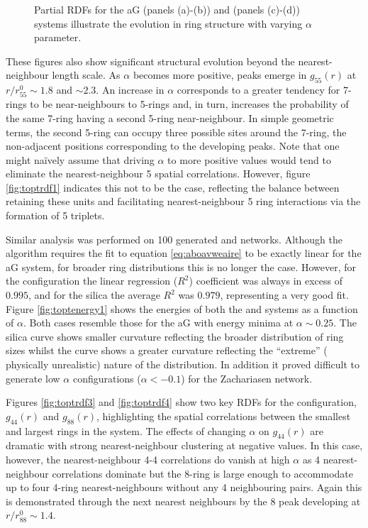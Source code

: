 \begin{figure}[bt]
     \caption{Partial RDFs for the aG (panels (a)\--(b)) and \zach{} (panels (c)\--(d)) systems illustrate the evolution in ring structure with varying $\alpha$ parameter.}
     \label{fig:toptrdf}
\end{figure}

These figures also show significant structural evolution beyond the nearest-neighbour length scale. 
As $\alpha$ becomes more positive, peaks emerge in $g_{55}\left(r\right)$ at $r/r_{55}^0\sim{1.8}$ and $\sim{2.3}$. 
An increase in $\alpha$ corresponds to a greater tendency for 7\--rings to
be near\--neighbours to 5\--rings and, in turn, increases the probability of the same 7\--ring having a second 5\--ring near\--neighbour. 
In simple geometric terms, the second 5\--ring can occupy three possible sites around the 7\--ring, the non\--adjacent positions corresponding to the developing peaks. 
Note that one might na\"ively assume that driving $\alpha$ to more positive values would tend to eliminate the nearest-neighbour 5 spatial correlations. However, figure \ref{fig:toptrdf1} indicates this not to be the case, reflecting the balance between retaining these units and facilitating nearest\--neighbour 5 ring interactions via the formation of 5 triplets.

Similar analysis was performed on 100 generated \zach{} and \sioii{} networks.
Although the algorithm requires the fit to equation \eqref{eq:aboavweaire} to be exactly linear for the aG system, for broader ring distributions this is no longer the case. 
However, for the \zach{} configuration the linear regression ($R^2$) coefficient was always in excess of $0.995$, and for the silica the average $R^{2}$ was $0.979$, representing a very good fit. 
Figure \ref{fig:toptenergy1} shows the energies of both the \zach{} and \sioii{} systems as a function of $\alpha$. 
Both cases resemble those for the aG with energy minima at $\alpha\sim{0.25}$. The silica curve shows smaller curvature reflecting the broader distribution
of ring sizes whilst the \zach{} curve shows a greater curvature reflecting the ``extreme'' (\ie{} physically unrealistic) nature of the distribution.
In addition it proved difficult to generate low $\alpha$ configurations ($\alpha<-0.1$) for the Zachariasen network.

Figures \ref{fig:toptrdf3} and \ref{fig:toptrdf4} show two key RDFs for the \zach{} configuration, $g_{44}\left(r\right)$ and $g_{88}\left(r\right)$, highlighting the spatial correlations between the smallest and largest rings in the system. 
The effects of changing $\alpha$ on $g_{44}\left(r\right)$ are dramatic with strong nearest\--neighbour clustering at negative values. 
In this case, however, the nearest-neighbour 4-4 correlations do vanish at high $\alpha$ as 4 nearest\--neighbour correlations dominate but the 8\--ring is large enough to accommodate up to four 4\--ring nearest\--neighbours without any 4 neighbouring pairs. 
Again this is demonstrated through the next nearest neighbours by the 8 peak developing at $r/r_{88}^0\sim 1.4$.


